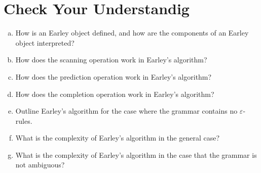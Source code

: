 \section{Check Your Understandig}
\begin{enumerate}[(a)]
\item How is an Earley object defined, and how are the components of an Earley object interpreted?
\item How does the scanning operation work in Earley's algorithm?
\item How does the prediction operation work in Earley's algorithm?
\item How does the completion operation work in Earley's algorithm?
\item Outline Earley's algorithm for the case where the grammar contains no $\varepsilon$-rules.
\item What is the complexity of Earley's algorithm in the general case?
\item What is the complexity of Earley's algorithm in the case that the grammar is not ambiguous?
\end{enumerate}


